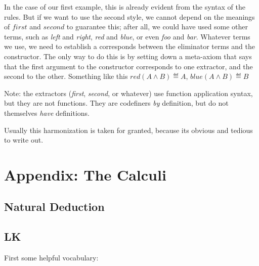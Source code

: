 \documentclass{article}
\begin{document}
In the case of our first example, this is already evident from the
syntax of the rules. But if we want to use the second style, we cannot
depend on the meanings of \(first\) and \(second\) to guarantee this;
after all, we could have used some other terms, such as \textit{left}
and \textit{right}, \textit{red} and \textit{blue}, or even
\textit{foo} and \textit{bar}. Whatever terms we use, we need to
establish a corresponds between the eliminator terms and the
constructor. The only way to do this is by setting down a meta-axiom
that says that the first argument to the constructor corresponds to
one extractor, and the second to the other. Something like this
\(red(A\land B)\eqdef A\), \(blue(A\land B)\eqdef B\)

Note: the extractors (\textit{first}, \textit{second}, or whatever)
use function application syntax, but they are not functions. They are
codefiners \textit{by} definition, but do not themselves \textit{have}
definitions.

Usually this harmonization is taken for granted, because its obvious
and tedious to write out.


\section{Appendix: The Calculi}

\subsection{Natural Deduction}


\subsection{LK}

First some helpful vocabulary:
\end{document}
